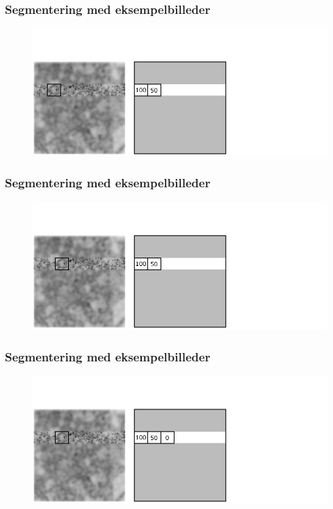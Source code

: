 \documentclass[12pt,t]{beamer}
\begin{document}
\begin{frame}
\frametitle{Segmentering med eksempelbilleder}
\begin{figure}[H]
\includegraphics[scale=0.35]{img/afstand/12.png}
\end{figure}
\end{frame}

\begin{frame}
\frametitle{Segmentering med eksempelbilleder}
\begin{figure}[H]
\includegraphics[scale=0.35]{img/afstand/13.png}
\end{figure}
\end{frame}

\begin{frame}
\frametitle{Segmentering med eksempelbilleder}
\begin{figure}[H]
\includegraphics[scale=0.35]{img/afstand/14.png}
\end{figure}
\end{frame}
\end{document}
